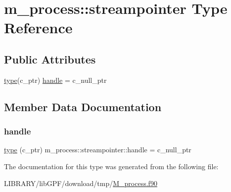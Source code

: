 \hypertarget{structm__process_1_1streampointer}{}\section{m\+\_\+process\+:\+:streampointer Type Reference}
\label{structm__process_1_1streampointer}
\subsection*{Public Attributes}
\begin{DoxyCompactItemize}
\item 
\hyperlink{stop__watch_83_8txt_a70f0ead91c32e25323c03265aa302c1c}{type}(c\+\_\+ptr) \hyperlink{structm__process_1_1streampointer_aaa577914dd36a5ef61670674dd3a194c}{handle} = c\+\_\+null\+\_\+ptr
\end{DoxyCompactItemize}


\subsection{Member Data Documentation}
\mbox{\label{structm__process_1_1streampointer_aaa577914dd36a5ef61670674dd3a194c}} 
\subsubsection{\texorpdfstring{handle}{handle}}
{\footnotesize\ttfamily \hyperlink{stop__watch_83_8txt_a70f0ead91c32e25323c03265aa302c1c}{type} (c\+\_\+ptr) m\+\_\+process\+::streampointer\+::handle = c\+\_\+null\+\_\+ptr}



The documentation for this type was generated from the following file\+:\begin{DoxyCompactItemize}
\item 
L\+I\+B\+R\+A\+R\+Y/lib\+G\+P\+F/download/tmp/\hyperlink{M__process_8f90}{M\+\_\+process.\+f90}\end{DoxyCompactItemize}
